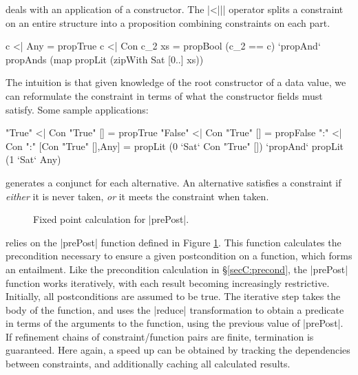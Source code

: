  deals with an application of a constructor. The |<||| operator splits a constraint on an entire structure into a proposition combining constraints on each part.

\begin{code}
c <| Any         =  propTrue
c <| Con c_2 xs  =  propBool (c_2 == c) `propAnd` propAnds (map propLit (zipWith Sat [0..] xs))
\end{code}

The intuition is that given knowledge of the root constructor of a data value, we can reformulate the constraint in terms of what the constructor fields must satisfy. Some sample applications:

\begin{code}
"True"   <| Con "True" [] = propTrue
"False"  <| Con "True" [] = propFalse
":" <| Con ":" [Con "True" [],Any]  =
    propLit (0 `Sat` Con "True" []) `propAnd` propLit (1 `Sat` Any)
\end{code}

 generates a conjunct for each alternative. An alternative satisfies a constraint if \textit{either} it is never taken, \textit{or} it meets the constraint when taken.

\begin{figure}
\ignore{}
\caption{Fixed point calculation for |prePost|.}
\label{figC:property_fixp}
\end{figure}

 relies on the |prePost| function defined in Figure \ref{figC:property_fixp}. This function calculates the precondition necessary to ensure a given postcondition on a function, which forms an entailment. Like the precondition calculation in \S\ref{secC:precond}, the |prePost| function works iteratively, with each result becoming increasingly restrictive. Initially, all postconditions are assumed to be true. The iterative step takes the body of the function, and uses the |reduce| transformation to obtain a predicate in terms of the arguments to the function, using the previous value of |prePost|. If refinement chains of constraint/function pairs are finite, termination is guaranteed. Here again, a speed up can be obtained by tracking the dependencies between constraints, and additionally caching all calculated results.

